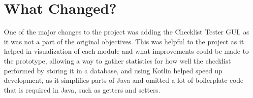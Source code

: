 \documentclass[../dissertation.tex]{subfiles}
\begin{document}
\section{What Changed?}
One of the major changes to the project was adding the Checklist Tester GUI, as it was
not a part of the original objectives. This was helpful to the project as it helped
in visualization of each module and what improvements could be made to the prototype,
allowing a way to gather statistics for how well the checklist performed by storing it
in a database, and using Kotlin helped speed up development, as it simplifies parts of
Java and omitted a lot of boilerplate code that is required in Java, such as getters and setters.
\end{document}
